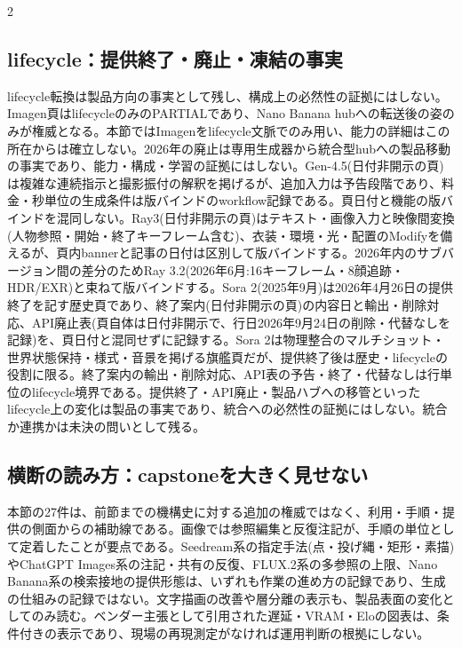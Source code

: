 \documentclass[lualatex,a4paper,10pt]{jlreq}
\begin{document}
\begin{multicols}{2}
\subsection{lifecycle：提供終了・廃止・凍結の事実}
lifecycle転換は製品方向の事実として残し、構成上の必然性の証拠にはしない。Imagen頁はlifecycleのみのPARTIALであり、Nano Banana hubへの転送後の姿のみが権威となる\autocite{btd106}。本節ではImagenをlifecycle文脈でのみ用い、能力の詳細はこの所在からは確立しない。2026年の廃止は専用生成器から統合型hubへの製品移動の事実であり、能力・構成・学習の証拠にはしない。Gen-4.5(日付非開示の頁)は複雑な連続指示と撮影振付の解釈を掲げるが、追加入力は予告段階であり、料金・秒単位の生成条件は版バインドのworkflow記録である\autocite{btd121}。頁日付と機能の版バインドを混同しない。Ray3(日付非開示の頁)はテキスト・画像入力と映像間変換(人物参照・開始・終了キーフレーム含む)、衣装・環境・光・配置のModifyを備えるが、頁内bannerと記事の日付は区別して版バインドする\autocite{btd122}。2026年内のサブバージョン間の差分のためRay 3.2(2026年6月:16キーフレーム・8顔追跡・HDR/EXR)と束ねて版バインドする。Sora 2(2025年9月)は2026年4月26日の提供終了を記す歴史頁であり、終了案内(日付非開示の頁)の内容日と輸出・削除対応、API廃止表(頁自体は日付非開示で、行日2026年9月24日の削除・代替なしを記録)を、頁日付と混同せずに記録する\autocite{btd123}\autocite{btd126}\autocite{btd127}\autocite{btd128}。Sora 2は物理整合のマルチショット・世界状態保持・様式・音景を掲げる旗艦頁だが、提供終了後は歴史・lifecycleの役割に限る。終了案内の輸出・削除対応、API表の予告・終了・代替なしは行単位のlifecycle境界である。提供終了・API廃止・製品ハブへの移管といったlifecycle上の変化は製品の事実であり、統合への必然性の証拠にはしない。統合か連携かは未決の問いとして残る。

\subsection{横断の読み方：capstoneを大きく見せない}
本節の27件は、前節までの機構史に対する追加の権威ではなく、利用・手順・提供の側面からの補助線である\autocite{btd100}\autocite{btd107}\autocite{btd111}\autocite{btd076}。画像では参照編集と反復注記が、手順の単位として定着したことが要点である。Seedream系の指定手法(点・投げ縄・矩形・素描)やChatGPT Images系の注記・共有の反復、FLUX.2系の多参照の上限、Nano Banana系の検索接地の提供形態は、いずれも作業の進め方の記録であり、生成の仕組みの記録ではない\autocite{btd101}\autocite{btd102}\autocite{btd103}\autocite{btd104}。文字描画の改善や層分離の表示も、製品表面の変化としてのみ読む。ベンダー主張として引用された遅延・VRAM・Eloの図表は、条件付きの表示であり、現場の再現測定がなければ運用判断の根拠にしない。


\end{multicols}
\end{document}
